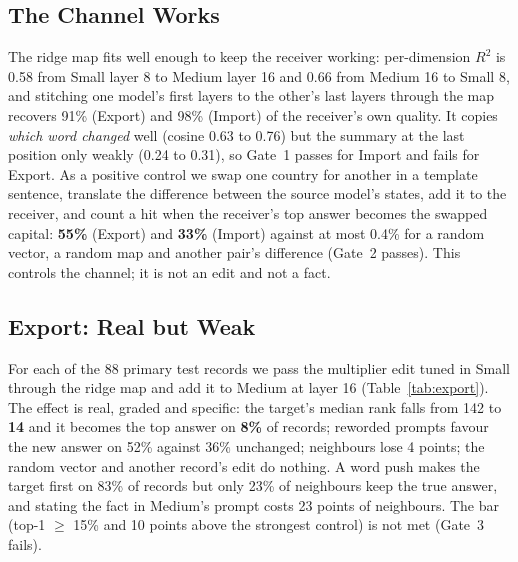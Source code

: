 \documentclass[11pt,twocolumn]{article}
\begin{document}
\subsection{The Channel Works}

The ridge map fits well enough to keep the receiver working: per-dimension $R^2$ is 0.58 from Small layer 8 to Medium layer 16 and 0.66 from Medium 16 to Small 8, and stitching one model's first layers to the other's last layers through the map recovers 91\% (Export) and 98\% (Import) of the receiver's own quality. It copies \emph{which word changed} well (cosine 0.63 to 0.76) but the summary at the last position only weakly (0.24 to 0.31), so Gate~1 passes for Import and fails for Export. As a positive control we swap one country for another in a template sentence, translate the difference between the source model's states, add it to the receiver, and count a hit when the receiver's top answer becomes the swapped capital: \textbf{55\%} (Export) and \textbf{33\%} (Import) against at most 0.4\% for a random vector, a random map and another pair's difference (Gate~2 passes). This controls the channel; it is not an edit and not a fact.

\subsection{Export: Real but Weak}

For each of the 88 primary test records we pass the multiplier edit tuned in Small through the ridge map and add it to Medium at layer 16 (Table~\ref{tab:export}). The effect is real, graded and specific: the target's median rank falls from 142 to \textbf{14} and it becomes the top answer on \textbf{8\%} of records; reworded prompts favour the new answer on 52\% against 36\% unchanged; neighbours lose 4 points; the random vector and another record's edit do nothing. A word push makes the target first on 83\% of records but only 23\% of neighbours keep the true answer, and stating the fact in Medium's prompt costs 23 points of neighbours. The bar (top-1 $\ge$ 15\% and 10 points above the strongest control) is not met (Gate~3 fails).
\end{document}
